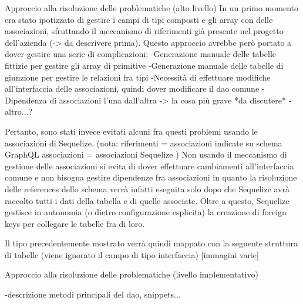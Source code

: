     Approccio alla risoluzione delle problematiche (alto livello)
        In un primo momento era stato ipotizzato di gestire i campi di tipi composti e gli array con delle associazioni, sfruttando il meccanismo di riferimenti già presente nel progetto dell'azienda (-> da descrivere prima).
        Questo approccio avrebbe però portato a dover gestire una serie di complicazioni:
            -Generazione manuale delle tabelle fittizie per gestire gli array di primitive
            -Generazione manuale delle tabelle di giunzione per gestire le relazioni fra tipi
            -Necessità di effettuare modifiche all'interfaccia delle associazioni, quindi dover modificare il dao comune
            -Dipendenza di associazioni l'una dall'altra -> la cosa più grave *da discutere*
            -altro...?
        
        Pertanto, sono stati invece evitati alcuni fra questi problemi usando le associazioni di Sequelize.
        (nota: riferimenti = associazioni indicate su schema GraphQL
               associazioni = associazioni Sequelize
        )
        Non usando il meccanismo di gestione delle associazioni si evita di dover effettuare cambiamenti all'interfaccia comune e non bisogna gestire dipendenze fra associazioni in quanto la risoluzione delle references dello schema verrà infatti eseguita solo dopo che Sequelize avrà raccolto tutti i dati della tabella e di quelle associate.
        Oltre a questo, Sequelize gestisce in autonomia (o dietro configurazione esplicita) la creazione di foreign keys per collegare le tabelle fra di loro.

        Il tipo precedentemente mostrato verrà quindi mappato con la seguente struttura di tabelle (viene ignorato il campo di tipo interfaccia)
        [immagini varie]

    Approccio alla risoluzione delle problematiche (livello implementativo)

        -descrizione metodi principali del dao, snippets...



